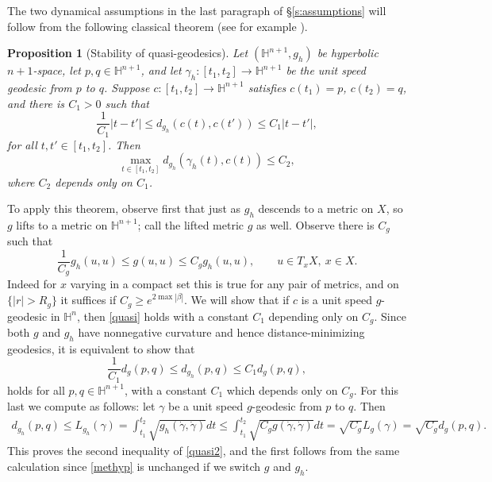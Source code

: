 \documentclass[reqno, 12pt]{amsart}
\newcommand \Hh {\mathbb{H}}
\newtheorem{prop}{Proposition}
\theoremstyle{definition}
\numberwithin{equation}{section}
\numberwithin{prop}{section}
\numberwithin{figure}{section}
\begin{document}
The two dynamical assumptions in the last paragraph of \S\ref{s:assumptions} will follow from the following classical theorem (see for example \cite[Theorem III.H.1.7]{brha}).

\begin{prop}[Stability of quasi-geodesics]
Let $(\Hh^{n+1},g_h)$ be hyperbolic $n+1$-space, let $p,q \in \Hh^{n+1}$, and let $\gamma_h\colon[t_1,t_2] \to \Hh^{n+1}$ be the unit speed geodesic from $p$ to $q$. Suppose $c\colon[t_1,t_2]\to\Hh^{n+1}$ satisfies $c(t_1) = p$, $c(t_2) = q$, and there is $C_1>0$ such that
\begin{equation}\label{quasi}\frac 1 {C_1} |t-t'|\le d_{g_h}(c(t),c(t')) \le C_1 |t-t'|,\end{equation}
for all $t,t'\in[t_1,t_2]$. Then
\begin{equation}\label{conquasi}\max_{t \in [t_1,t_2]}d_{g_h}(\gamma_h(t),c(t)) \le C_2,\end{equation}
where $C_2$ depends only on $C_1$.
\end{prop}

To apply this theorem, observe first that just as $g_h$ descends to a metric on $X$, so $g$ lifts to a metric on $\Hh^{n+1}$; call the lifted metric $g$ as well. Observe there is $C_g$ such that
\begin{equation}\label{methyp}\frac 1{C_g} g_h(u,u) \le g(u,u) \le C_g g_h(u,u), \qquad u \in T_x X, \ x \in X.\end{equation}
Indeed for $x$ varying in a compact set this is true for any pair of metrics, and on $\{|r|>R_g\}$ it suffices if $C_g \ge e^{2\max|\beta|}$. We will show that if $c$ is a unit speed $g$-geodesic in $\Hh^n$, then \eqref{quasi} holds with a constant $C_1$ depending only on $C_g$. Since both $g$ and $g_h$ have nonnegative curvature and hence  distance-minimizing geodesics, it is equivalent to show that
\begin{equation}\label{quasi2}\frac 1 {C_1} d_g(p,q)  \le d_{g_h}(p,q) \le {C_1} d_g(p,q),\end{equation}
holds for all $p,q \in \Hh^{n+1}$, with a constant $C_1$ which depends only on $C_g$. For this last we compute as follows: let $\gamma$ be a unit speed $g$-geodesic from $p$ to $q$. Then
\[\begin{split}d_{g_h}(p,q) \le L_{g_h}(\gamma) = \int_{t_1}^{t_2} \sqrt{g_h(\dot\gamma,\dot\gamma)}dt \le\int_{t_1}^{t_2} \sqrt{C_g g(\dot\gamma,\dot\gamma)}dt %
= \sqrt{C_g}L_g(\gamma)=\sqrt{C_g}d_g(p,q). \end{split}\]
This proves the second inequality of \eqref{quasi2}, and the first follows from the same calculation since  \eqref{methyp} is unchanged if we switch $g$ and $g_h$.
\end{document}
